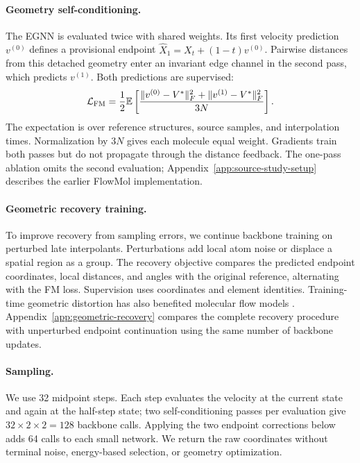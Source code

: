 \documentclass{article}
\newcommand{\EE}{\mathbb E}
\begin{document}
\paragraph{Geometry self-conditioning.}
The EGNN is evaluated twice with shared weights. Its first velocity prediction $v^{(0)}$ defines a provisional endpoint $\widehat X_1=X_t+(1-t)v^{(0)}$. Pairwise distances from this detached geometry enter an invariant edge channel in the second pass, which predicts $v^{(1)}$. Both predictions are supervised:
\begin{equation}
 \mathcal L_{\rm FM}=\frac12\EE\left[
 \frac{\|v^{(0)}-V^*\|_F^2+\|v^{(1)}-V^*\|_F^2}{3N}\right].
\end{equation}
The expectation is over reference structures, source samples, and interpolation times. Normalization by $3N$ gives each molecule equal weight. Gradients train both passes but do not propagate through the distance feedback. The one-pass ablation omits the second evaluation; Appendix~\ref{app:source-study-setup} describes the earlier FlowMol implementation.

\paragraph{Geometric recovery training.}
To improve recovery from sampling errors, we continue backbone training on perturbed late interpolants. Perturbations add local atom noise or displace a spatial region as a group. The recovery objective compares the predicted endpoint coordinates, local distances, and angles with the original reference, alternating with the FM loss. Supervision uses coordinates and element identities. Training-time geometric distortion has also benefited molecular flow models \citep{flowmol3}. Appendix~\ref{app:geometric-recovery} compares the complete recovery procedure with unperturbed endpoint continuation using the same number of backbone updates.

\paragraph{Sampling.}
We use 32 midpoint steps. Each step evaluates the velocity at the current state and again at the half-step state; two self-conditioning passes per evaluation give $32\times2\times2=128$ backbone calls. Applying the two endpoint corrections below adds 64 calls to each small network. We return the raw coordinates without terminal noise, energy-based selection, or geometry optimization.
\end{document}
